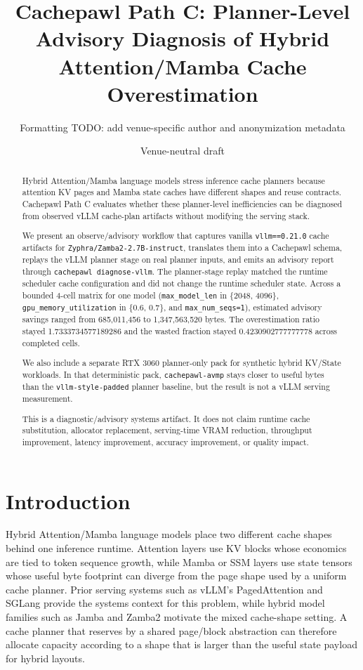 \documentclass[11pt]{article}
\title{Cachepawl Path C: Planner-Level Advisory Diagnosis of Hybrid Attention/Mamba Cache Overestimation}
\author{Formatting TODO: add venue-specific author and anonymization metadata}
\date{Venue-neutral draft}
\begin{document}
\sloppy

\maketitle

\begin{abstract}
Hybrid Attention/Mamba language models stress inference cache planners because
attention KV pages and Mamba state caches have different shapes and reuse
contracts. Cachepawl Path C evaluates whether these planner-level
inefficiencies can be diagnosed from observed vLLM cache-plan artifacts without
modifying the serving stack.

We present an observe/advisory workflow that captures vanilla
\texttt{vllm==0.21.0} cache artifacts for
\texttt{Zyphra/Zamba2-2.7B-instruct}, translates them into a Cachepawl schema,
replays the vLLM planner stage on real planner inputs, and emits an advisory
report through \texttt{cachepawl diagnose-vllm}. The planner-stage replay
matched the runtime scheduler cache configuration and did not change the
runtime scheduler state. Across a bounded 4-cell matrix for one model
(\texttt{max\_model\_len} in \{2048, 4096\},
\texttt{gpu\_memory\_utilization} in \{0.6, 0.7\}, and
\texttt{max\_num\_seqs=1}), estimated advisory savings ranged from
685,011,456 to 1,347,563,520 bytes. The overestimation ratio stayed
1.7333734577189286 and the wasted fraction stayed 0.4230902777777778 across
completed cells.

We also include a separate RTX 3060 planner-only pack for synthetic hybrid
KV/State workloads. In that deterministic pack, \texttt{cachepawl-avmp} stays
closer to useful bytes than the \texttt{vllm-style-padded} planner baseline,
but the result is not a vLLM serving measurement.

This is a diagnostic/advisory systems artifact. It does not claim runtime cache
substitution, allocator replacement, serving-time VRAM reduction, throughput
improvement, latency improvement, accuracy improvement, or quality impact.
\end{abstract}

\section{Introduction}

Hybrid Attention/Mamba language models place two different cache shapes behind
one inference runtime. Attention layers use KV blocks whose economics are tied
to token sequence growth, while Mamba or SSM layers use state tensors whose
useful byte footprint can diverge from the page shape used by a uniform cache
planner. Prior serving systems such as vLLM's PagedAttention
\cite{kwon2023pagedattention} and SGLang \cite{zheng2024sglang} provide the
systems context for this problem, while hybrid model families such as Jamba
\cite{lieber2024jamba} and Zamba2 \cite{glorioso2024zamba2} motivate the mixed
cache-shape setting. A cache planner that reserves by a shared page/block
abstraction can therefore allocate capacity according to a shape that is larger
than the useful state payload for hybrid layouts.
\end{document}
